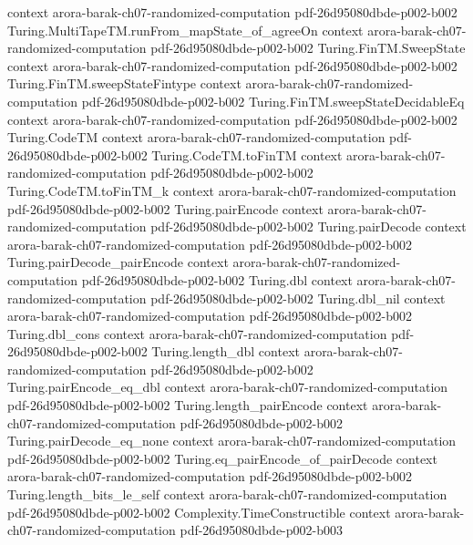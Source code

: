 \begin{theorem}
  {context}
  {arora-barak-ch07-randomized-computation}
  {pdf-26d95080dbde-p002-b002}
\proofstep
  {Turing.MultiTapeTM.runFrom_mapState_of_agreeOn}
  {context}
  {arora-barak-ch07-randomized-computation}
  {pdf-26d95080dbde-p002-b002}
\proofstep
  {Turing.FinTM.SweepState}
  {context}
  {arora-barak-ch07-randomized-computation}
  {pdf-26d95080dbde-p002-b002}
\proofstep
  {Turing.FinTM.sweepStateFintype}
  {context}
  {arora-barak-ch07-randomized-computation}
  {pdf-26d95080dbde-p002-b002}
\proofstep
  {Turing.FinTM.sweepStateDecidableEq}
  {context}
  {arora-barak-ch07-randomized-computation}
  {pdf-26d95080dbde-p002-b002}
\proofstep
  {Turing.CodeTM}
  {context}
  {arora-barak-ch07-randomized-computation}
  {pdf-26d95080dbde-p002-b002}
\proofstep
  {Turing.CodeTM.toFinTM}
  {context}
  {arora-barak-ch07-randomized-computation}
  {pdf-26d95080dbde-p002-b002}
\proofstep
  {Turing.CodeTM.toFinTM_k}
  {context}
  {arora-barak-ch07-randomized-computation}
  {pdf-26d95080dbde-p002-b002}
\proofstep
  {Turing.pairEncode}
  {context}
  {arora-barak-ch07-randomized-computation}
  {pdf-26d95080dbde-p002-b002}
\proofstep
  {Turing.pairDecode}
  {context}
  {arora-barak-ch07-randomized-computation}
  {pdf-26d95080dbde-p002-b002}
\proofstep
  {Turing.pairDecode_pairEncode}
  {context}
  {arora-barak-ch07-randomized-computation}
  {pdf-26d95080dbde-p002-b002}
\proofstep
  {Turing.dbl}
  {context}
  {arora-barak-ch07-randomized-computation}
  {pdf-26d95080dbde-p002-b002}
\proofstep
  {Turing.dbl_nil}
  {context}
  {arora-barak-ch07-randomized-computation}
  {pdf-26d95080dbde-p002-b002}
\proofstep
  {Turing.dbl_cons}
  {context}
  {arora-barak-ch07-randomized-computation}
  {pdf-26d95080dbde-p002-b002}
\proofstep
  {Turing.length_dbl}
  {context}
  {arora-barak-ch07-randomized-computation}
  {pdf-26d95080dbde-p002-b002}
\proofstep
  {Turing.pairEncode_eq_dbl}
  {context}
  {arora-barak-ch07-randomized-computation}
  {pdf-26d95080dbde-p002-b002}
\proofstep
  {Turing.length_pairEncode}
  {context}
  {arora-barak-ch07-randomized-computation}
  {pdf-26d95080dbde-p002-b002}
\proofstep
  {Turing.pairDecode_eq_none}
  {context}
  {arora-barak-ch07-randomized-computation}
  {pdf-26d95080dbde-p002-b002}
\proofstep
  {Turing.eq_pairEncode_of_pairDecode}
  {context}
  {arora-barak-ch07-randomized-computation}
  {pdf-26d95080dbde-p002-b002}
\proofstep
  {Turing.length_bits_le_self}
  {context}
  {arora-barak-ch07-randomized-computation}
  {pdf-26d95080dbde-p002-b002}
\proofstep
  {Complexity.TimeConstructible}
  {context}
  {arora-barak-ch07-randomized-computation}
  {pdf-26d95080dbde-p002-b003}

\end{theorem}
